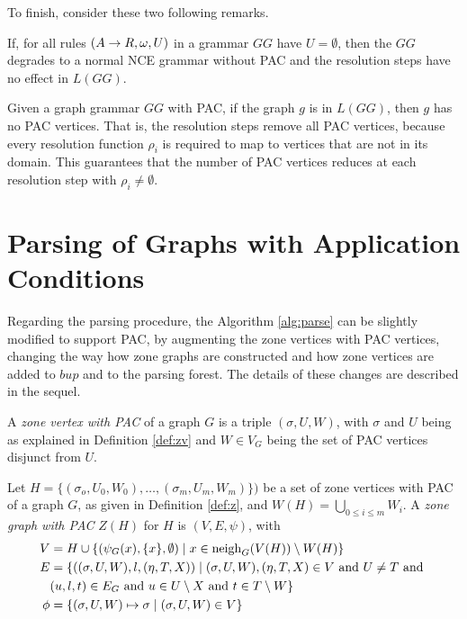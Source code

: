 To finish, consider these two following remarks.

\begin{remark}
	If, for all rules $(A \to R,\omega,U)$ in a grammar $GG$ have $U = \emptyset$, then the $GG$ degrades to a normal NCE grammar without PAC and the resolution steps have no effect in $L(GG)$.
\end{remark}

\begin{remark}
	Given a graph grammar $GG$ with PAC, if the graph $g$ is in $L(GG)$, then $g$ has no PAC vertices. That is, the resolution steps remove all PAC vertices, because every resolution function $\rho_i$ is required to map to vertices that are not in its domain. This guarantees that the number of PAC vertices reduces at each resolution step with $\rho_i \neq \emptyset$.
\end{remark}

\section{Parsing of Graphs with Application Conditions}
Regarding the parsing procedure, the Algorithm \ref{alg:parse} can be slightly modified to support PAC, by augmenting the zone vertices with PAC vertices, changing the way how zone graphs are constructed and how zone vertices are added to $bup$ and to the parsing forest. The details of these changes are described in the sequel.

\begin{definition}
	A \emph{zone vertex with PAC} of a graph $G$ is a triple $(\sigma, U, W)$, with $\sigma$ and $U$ being as explained in Definition \ref{def:zv} and $W \in V_G$ being the set of PAC vertices disjunct from $U$.
\end{definition}

\begin{definition}
	Let $H = \{(\sigma_o,U_0,W_0), \dots, (\sigma_m, U_m, W_m)\})$ be a set of zone vertices with PAC of a graph $G$, as given in Definition \ref{def:z}, and $W(H) = \bigcup_{0 \le i \le m}{W_i}$. A \emph{zone graph with PAC} $Z(H)$ for $H$ is $(V,E,\psi)$, with
	\begin{align*}
		V & = H \cup \{(\psi_G(x),\{x\}, \emptyset) \; | \; x \in \operatorname{neigh}_{G}(V(H)) \setminus W(H) \} \\
		E & = \{((\sigma,U,W),l,(\eta,T,X)) \; | \; (\sigma,U,W),(\eta,T,X) \in V \text{ and } U \neq T \text{ and } \\
		& (u,l,t) \in E_G \text{ and } u \in U \setminus X \text{ and } t \in T \setminus W \} \\
		\phi & = \{(\sigma,U,W) \mapsto \sigma \; | \; (\sigma,U,W) \in V\}
	\end{align*}
\end{definition}

